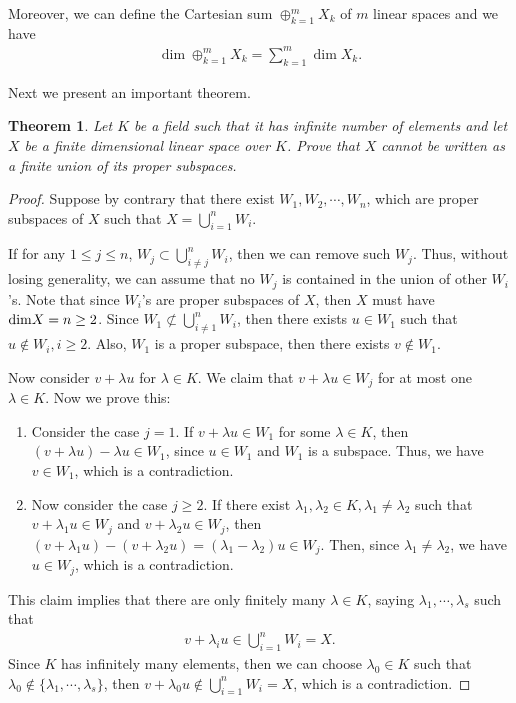 \documentclass[11pt]{book}
\newtheorem{theorem}{Theorem}[chapter]
\theoremstyle{definition}
\numberwithin{equation}{chapter}
\begin{document}
Moreover, we can define the Cartesian sum $\oplus^m_{k=1}X_k$ of $m$ linear spaces and we have 
\begin{align*}
    \dim \oplus^m_{k=1}X_k = \sum^m_{k=1}\dim X_k.
\end{align*}

\medskip

Next we present an important theorem.

\medskip

\begin{theorem}
Let $K$ be a field such that it has infinite number of elements and let $X$ be a finite dimensional linear space over $K$. Prove that $X$ cannot be written as a finite union of its proper subspaces.
\end{theorem}
\begin{proof}
Suppose by contrary that there exist $W_1, W_2,\cdots, W_n$, which are proper subspaces of $X$ such that $X = \bigcup^n_{i=1}W_i$. 

If for any $1\leq j\leq n$, $W_j\subset \bigcup^n_{i\neq j}W_i$, then we can remove such $W_j$. Thus, without losing generality, we can assume that no $W_j$ is contained in the union of other $W_i$'s. Note that since $W_i$'s are proper subspaces of $X$, then $X$ must have ${\rm dim}X = n \geq 2$. Since $W_1\not\subset \bigcup^n_{i\neq 1}W_i$, then there exists $u\in W_1$ such that $u\notin W_i, i\geq 2$. Also, $W_1$ is a proper subspace, then there exists $v\notin W_1$. 

Now consider $v + \lambda u$ for $\lambda\in K$. We claim that $v + \lambda u\in W_j$ for at most one $\lambda\in K$. Now we prove this:
\begin{enumerate}[label=(\alph*)]
    \item Consider the case $j=1$. If $v + \lambda u\in W_1$ for some $\lambda\in K$, then $(v + \lambda u) - \lambda u\in W_1$, since $u\in W_1$ and $W_1$ is a subspace. Thus, we have $v\in W_1$, which is a contradiction.
    \item Now consider the case $j\geq 2$. If there exist $\lambda_1, \lambda_2\in K, \lambda_1\neq\lambda_2$ such that $v+\lambda_1 u\in W_j$ and $v+\lambda_2 u\in W_j$, then $(v+\lambda_1 u) - (v+\lambda_2 u) = (\lambda_1 - \lambda_2)u \in W_j$. Then, since $\lambda_1\neq\lambda_2$, we have $u\in W_j$, which is a contradiction.
\end{enumerate}

This claim implies that there are only finitely many $\lambda\in K$, saying $\lambda_1, \cdots, \lambda_s$ such that 
\begin{align*}
    v+\lambda_i u \in \bigcup^n_{i=1}W_i = X.
\end{align*}
Since $K$ has infinitely many elements, then we can choose $\lambda_0\in K$ such that $\lambda_0\notin \{\lambda_1, \cdots, \lambda_s\}$, then $v+\lambda_0 u\notin \bigcup^n_{i=1}W_i = X$, which is a contradiction.
\end{proof}
\end{document}
